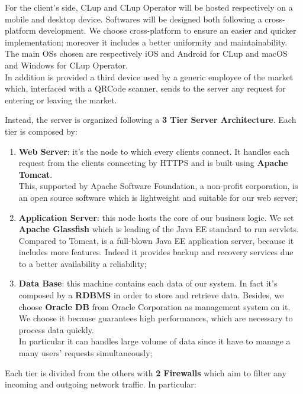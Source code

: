 For the client's side, CLup and CLup Operator will be hosted respectively on a mobile and desktop device. Softwares will be designed both following a cross-platform development. 
We choose cross-platform to ensure an easier and quicker implementation; moreover it includes a better uniformity and maintainability.\\ 
The main OSs chosen are respectively iOS and Android for CLup and macOS and Windows for CLup Operator.\\
In addition is provided a third device used by a generic employee of the market which, interfaced with a QRCode scanner, sends to the server any request for entering or leaving  the market. \pagebreak

Instead, the server is organized following a \textbf{3 Tier Server Architecture}. Each tier is composed by:

\begin{enumerate}
\item \textbf{Web Server}: it's the node to which every clients connect. It handles each request from the clients connecting by HTTPS and is built using \textbf{Apache Tomcat}. \\
This, supported by Apache Software Foundation, a non-profit corporation, is an open source software which is lightweight and suitable for our web server;
\item \textbf{Application Server}: this node hosts the core of our business logic. We set \textbf{Apache Glassfish} which is leading of the Java EE standard to run servlets.\\
Compared to Tomcat, is a full-blown Java EE application server, because it includes more features. Indeed it provides backup and recovery services due to a better availability a reliability;

\item \textbf{Data Base}: this machine contains each data of our system. In fact it's composed by a \textbf{RDBMS} in order to store and retrieve data. Besides, we choose \textbf{Oracle DB} from Oracle Corporation as management system on it. We choose it because guarantees high performances, which are necessary to process data quickly. \\
In particular it can handles large volume of data since it have to manage a many users' requests simultaneously;
\end{enumerate}
\bigskip
Each tier is divided from the others with \textbf{2 Firewalls} which aim to filter any incoming and outgoing network traffic.
In particular:

